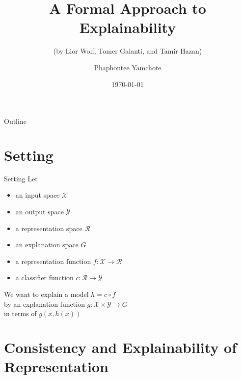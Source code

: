 \documentclass[10pt, aspectratio=169]{beamer}
\title{A Formal Approach to Explainability}
\subtitle{(by Lior Wolf, Tomer Galanti, and Tamir Hazan)}
\date{\today}
\author{Phaphontee Yamchote}
\begin{document}
	\titlepage
	\begin{frame}{Outline}
		\tableofcontents
	\end{frame}
	\section{Setting}
	\begin{frame}{Setting}
		Let 
		\begin{itemize}
			\item an input space $\mathcal{X}$
			\item an output space $\mathcal{Y}$ 
			\item a representation space $\mathcal{R}$
			\item an explanation space $G$
			\item a representation function $f:\mathcal{X}\to\mathcal{R}$
			\item a classifier function $c:\mathcal{R}\to\mathcal{Y}$
		\end{itemize}
		
		We want to explain a model $h = c\circ f$\\
		by an explanation function $g:\mathcal{X}\times\mathcal{Y}\to G$\\
		in terms of $g(x,h(x))$
	\end{frame}
	
	\section{Consistency and Explainability of Representation}
	
\end{document}
